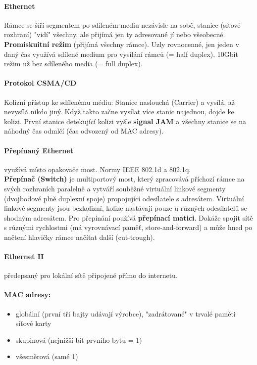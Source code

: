 \documentclass[10pt,a4paper]{article}
\begin{document}
\paragraph{Ethernet} Rámce se šíří segmentem po sdíleném mediu nezávisle na sobě, stanice (síťové rozhraní) "vidí" všechny, ale přijímá jen ty adresované jí nebo všeobecné. \textbf{Promiskuitní režim} (přijímá všechny rámce). Uzly rovnocenné, jen jeden v daný čas využívá sdílené medium pro vysílání rámců (= half duplex). 10Gbit režim už bez sdíleného media (= full duplex).
\paragraph{Protokol CSMA/CD} Kolizní přístup ke sdílenému médiu: Stanice naslouchá (Carrier) a vysílá, až nevysílá nikdo jiný. Když takto začne vysílat více stanic najednou, dojde ke kolizi. První stanice detekující kolizi vyšle \textbf{signal JAM} a všechny stanice se na náhodný čas odmlčí (čas odvozený od MAC adresy).
\paragraph{Přepínaný Ethernet} využívá místo opakovače most. Normy IEEE 802.1d a 802.1q. \\
\textbf{Přepínač (Switch)} je multiportový most, který zpracovává příchozí rámce na svých rozhraních paralelně a vytváří souběžné virtuální linkové segmenty (dvojbodové plně duplexní spoje) propojující odesílatele s adresátem. Virtuální linkové segmenty jsou bezkolizní, kolize nastávají pouze u různých odesílatelů se shodným adresátem. Pro přepínání používá \textbf{přepínací matici}. Dokáže spojit sítě s různými rychlostmi (má vyrovnávací paměť, store-and-forward) a může hned po načtení hlavičky rámce načítat další (cut-trough).
\paragraph{Ethernet II} předepsaný pro lokální sítě připojené přímo do internetu.
\paragraph{MAC adresy:}
\begin{itemize}
	\item globální (první tři bajty udávají výrobce), "zadrátované" v trvalé paměti síťové karty
	\item skupinová (nejnižší bit prvního bytu = 1)
	\item všesměrová (samé 1)
\end{itemize}
\end{document}
